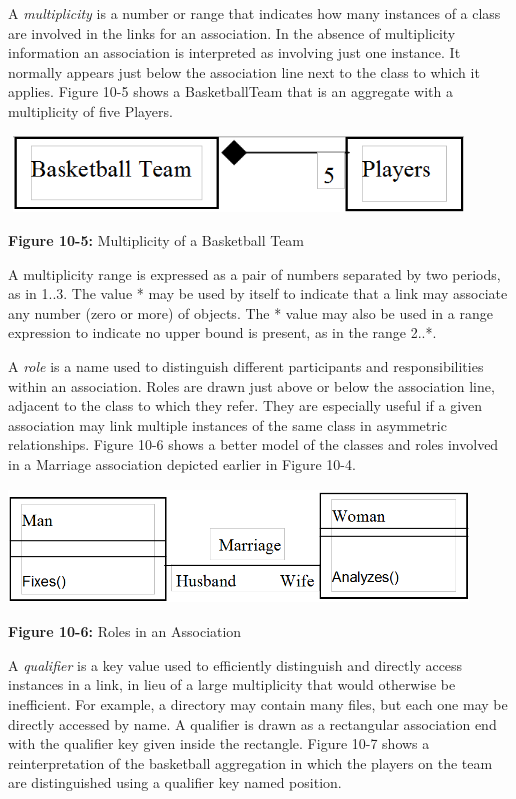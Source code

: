 A \textit{multiplicity} is a number or range that
indicates how many instances of a class are involved in the links for
an association. In the absence of multiplicity information an
association is interpreted as involving just one instance. It normally
appears just below the association line next to the class to which it
applies. Figure 10-5 shows a BasketballTeam that is an aggregate with a
multiplicity of five Players.

\bigskip

\includegraphics[width=4.8in,height=0.8in]{ub-img/multipcy.png}

{\sffamily\bfseries Figure 10-5:}
{\sffamily Multiplicity of a Basketball Team}

\bigskip

A multiplicity range is expressed as a pair of numbers separated by two
periods, as in 1..3. The value * may be used by itself to indicate that
a link may associate any number (zero or more) of objects. The * value
may also be used in a range expression to indicate no upper bound is
present, as in the range 2..*.

A \textit{role} is a name used to distinguish different
participants and responsibilities within an association. Roles are
drawn just above or below the association line, adjacent to the class
to which they refer. They are especially useful if a given association
may link multiple instances of the same class in asymmetric
relationships. Figure 10-6 shows a better model of the classes and
roles involved in a Marriage association depicted earlier in Figure
10-4.

\bigskip

\includegraphics[width=4.8in,height=1.2in]{ub-img/roles.png}


{\sffamily\bfseries Figure 10-6:}
{\sffamily Roles in an Association}

\bigskip

A \textit{qualifier} is a key value used to efficiently
distinguish and directly access instances in a link, in lieu of a large
multiplicity that would otherwise be inefficient. For example, a
directory may contain many files, but each one may be directly accessed
by name. A qualifier is drawn as a rectangular association end with the
qualifier key given inside the rectangle. Figure 10-7 shows a
reinterpretation of the basketball aggregation in which the players on
the team are distinguished using a qualifier key named position.


